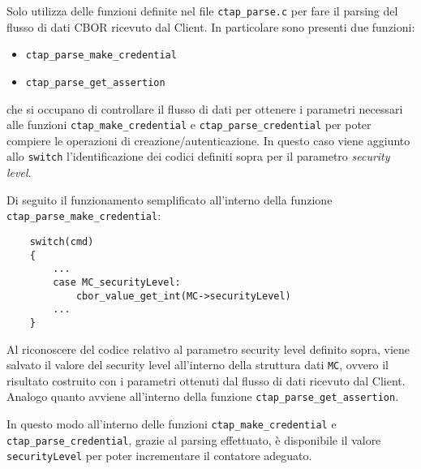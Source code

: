Solo utilizza delle funzioni definite nel file \verb*|ctap_parse.c| per fare il parsing del flusso di dati CBOR ricevuto dal Client. In particolare sono presenti due funzioni:
\begin{itemize}
	\item \verb*|ctap_parse_make_credential|
	\item \verb*|ctap_parse_get_assertion|
\end{itemize}

che si occupano di controllare il flusso di dati per ottenere i parametri necessari alle funzioni \verb*|ctap_make_credential| e \verb*|ctap_parse_credential| per poter compiere le operazioni di creazione/autenticazione. In questo caso viene aggiunto allo \verb*|switch| l'identificazione dei codici definiti sopra per il parametro \emph{security level}. 

Di seguito il funzionamento semplificato all'interno della funzione \verb*|ctap_parse_make_credential|:
\begin{verbatim}
    switch(cmd)
    {
        ...
        case MC_securityLevel:
            cbor_value_get_int(MC->securityLevel)
        ...
    }
\end{verbatim}
Al riconoscere del codice relativo al parametro security level definito sopra, viene salvato il valore del security level all'interno della struttura dati \verb*|MC|, ovvero il risultato costruito con i parametri ottenuti dal flusso di dati ricevuto dal Client.
Analogo quanto avviene all'interno della funzione \verb*|ctap_parse_get_assertion|. 

In questo modo all'interno delle funzioni \verb*|ctap_make_credential| e \verb*|ctap_parse_credential|, grazie al parsing effettuato, è disponibile il valore \verb*|securityLevel| per poter incrementare il contatore adeguato. 


